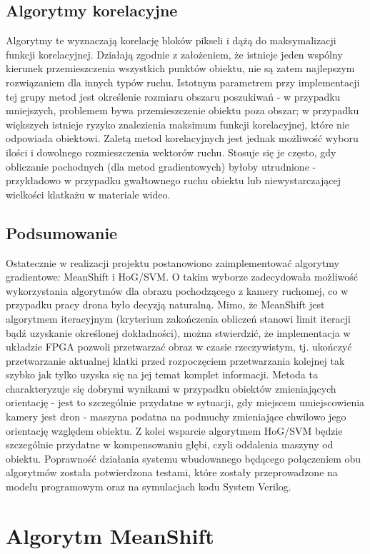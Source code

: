 \subsection{Algorytmy korelacyjne}
Algorytmy te wyznaczają korelację bloków pikseli i dążą do maksymalizacji funkcji korelacyjnej. Działają zgodnie z założeniem, że istnieje jeden wspólny kierunek przemieszczenia wszystkich punktów obiektu, nie są zatem najlepszym rozwiązaniem dla innych typów ruchu. Istotnym parametrem przy implementacji tej grupy metod jest określenie rozmiaru obszaru poszukiwań - w przypadku mniejszych, problemem bywa przemieszczenie obiektu poza obszar; w przypadku większych istnieje ryzyko znalezienia maksimum funkcji korelacyjnej, które nie odpowiada obiektowi. Zaletą metod korelacyjnych jest jednak możliwość wyboru ilości i dowolnego rozmieszczenia wektorów ruchu. Stosuje się je często, gdy obliczanie pochodnych (dla metod gradientowych) byłoby utrudnione - przykładowo w przypadku gwałtownego ruchu obiektu lub niewystarczającej wielkości klatkażu w materiale wideo.

\subsection{Podsumowanie}
Ostatecznie w realizacji projektu postanowiono zaimplementować algorytmy gradientowe: MeanShift i HoG/SVM. O takim wyborze zadecydowała możliwość wykorzystania algorytmów dla obrazu pochodzącego z kamery ruchomej, co w przypadku pracy drona było decyzją naturalną. Mimo, że MeanShift jest algorytmem iteracyjnym (kryterium zakończenia obliczeń stanowi limit iteracji bądź uzyskanie określonej dokładności), można stwierdzić, że implementacja w układzie FPGA pozwoli przetwarzać obraz w czasie rzeczywistym, tj. ukończyć przetwarzanie aktualnej klatki przed rozpoczęciem przetwarzania kolejnej tak szybko jak tylko uzyska się na jej temat komplet informacji. Metoda ta charakteryzuje się dobrymi wynikami w przypadku obiektów zmieniających orientację - jest to szczególnie przydatne w sytuacji, gdy miejscem umiejscowienia kamery jest dron - maszyna podatna na podmuchy zmieniające chwilowo jego orientację względem obiektu. Z kolei wsparcie algorytmem HoG/SVM będzie szczególnie przydatne w kompensowaniu głębi, czyli oddalenia maszyny od obiektu. Poprawność działania systemu wbudowanego będącego połączeniem obu algorytmów została potwierdzona testami, które zostały przeprowadzone na modelu programowym oraz na symulacjach kodu System Verilog.

\section{Algorytm MeanShift}

